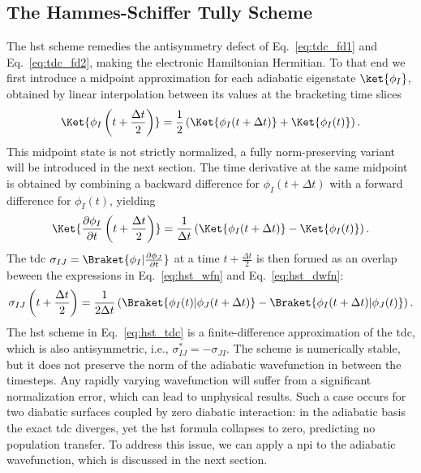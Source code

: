 \subsection{The Hammes-Schiffer Tully Scheme}\label{sec:hammes_schiffer_tully_scheme}
The \acrfull{hst}\supercite{10.1063/1.467455} scheme remedies the antisymmetry defect of Eq.~\eqref{eq:tdc_fd1} and Eq.~\eqref{eq:tdc_fd2}, making the electronic Hamiltonian Hermitian. To that end we first introduce a midpoint approximation for each adiabatic eigenstate $\ket{\phi_I}$, obtained by linear interpolation between its values at the bracketing time slices
\begin{equation}\label{eq:hst_wfn}
\Ket{\phi_I\left(t+\frac{\Delta t}{2}\right)}=\frac{1}{2}\left(\Ket{\phi_I(t+\Delta t)}+\Ket{\phi_I(t)}\right).
\end{equation}
This midpoint state is not strictly normalized, a fully norm-preserving variant will be introduced in the next section. The time derivative at the same midpoint is obtained by combining a backward difference for $\phi_I(t+\Delta t)$ with a forward difference for $\phi_I(t)$, yielding
\begin{equation}\label{eq:hst_dwfn}
\Ket{\frac{\partial\phi_I}{\partial t}\left(t+\frac{\Delta t}{2}\right)}=\frac{1}{\Delta t}\left(\Ket{\phi_I(t+\Delta t)}-\Ket{\phi_I(t)}\right).
\end{equation}
The \acrshort{tdc} $\sigma_{IJ}=\Braket{\phi_I\vert\frac{\partial \phi_J}{\partial t}}$ at a time $t+\frac{\Delta t}{2}$ is then formed as an overlap beween the expressions in Eq.~\eqref{eq:hst_wfn} and Eq.~\eqref{eq:hst_dwfn}:
\begin{equation}\label{eq:hst_tdc}
\sigma_{IJ}\left(t+\frac{\Delta t}{2}\right)=\frac{1}{2\Delta t}\left(\Braket{\phi_I(t)\vert\phi_J(t+\Delta t)}-\Braket{\phi_I(t+\Delta t)\vert\phi_J(t)}\right).
\end{equation}
The \acrshort{hst} scheme in Eq.~\eqref{eq:hst_tdc} is a finite-difference approximation of the \acrshort{tdc}, which is also antisymmetric, i.e., $\sigma_{IJ}^\ast=-\sigma_{JI}$. The scheme is numerically stable, but it does not preserve the norm of the adiabatic wavefunction in between the timesteps. Any rapidly varying wavefunction will suffer from a significant normalization error, which can lead to unphysical results. Such a case occurs for two diabatic surfaces coupled by zero diabatic interaction: in the adiabatic basis the exact \acrshort{tdc} diverges, yet the \acrshort{hst} formula collapses to zero, predicting no population transfer. To address this issue, we can apply a \acrfull{npi} to the adiabatic wavefunction, which is discussed in the next section.
